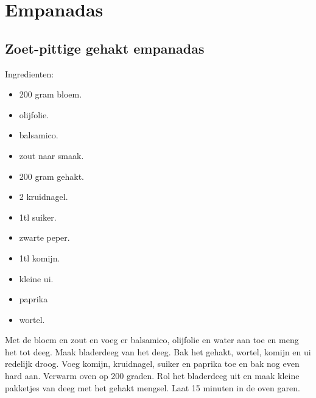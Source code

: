 \section{Empanadas}

\subsection{Zoet-pittige gehakt empanadas}

Ingredienten:
\begin{itemize}
\item 200 gram bloem.
\item olijfolie.
\item balsamico.
\item zout naar smaak.
\item 200 gram gehakt.
\item 2 kruidnagel.
\item 1tl suiker.
\item zwarte peper.
\item 1tl komijn.
\item kleine ui.
\item paprika
\item wortel.
\end{itemize}

Met de bloem en zout en voeg er balsamico, olijfolie en water aan toe en meng het tot deeg.
Maak bladerdeeg van het deeg.
Bak het gehakt, wortel, komijn en ui redelijk droog.
Voeg komijn, kruidnagel, suiker en paprika toe en bak nog even hard aan.
Verwarm oven op 200 graden.
Rol het bladerdeeg uit en maak kleine pakketjes van deeg met het gehakt mengsel.
Laat 15 minuten in de oven garen.

